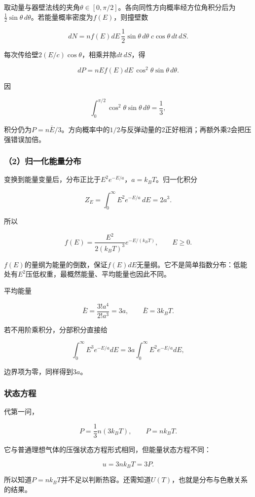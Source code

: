 \documentclass[12pt,a4paper,fontset=fandol]{ctexart}
\begin{document}
取动量与器壁法线的夹角\(\theta\in[0,\pi/2]\)。各向同性方向概率经方位角积分后为\(\frac12\sin\theta\,d\theta\)。若能量概率密度为\(f(E)\)，则撞壁数

\[
dN=n f(E)dE\,\frac12\sin\theta\,d\theta
\;c\cos\theta\,dt\,dS.
\]

每次传给壁\(2(E/c)\cos\theta\)，相乘并除\(dt\,dS\)，得

\[
dP=nE f(E)dE\,\cos^2\theta\sin\theta\,d\theta.
\]

因

\[
\int_0^{\pi/2}\cos^2\theta\sin\theta\,d\theta=\frac13,
\]

积分仍为\(P=n\bar E/3\)。方向概率中的\(1/2\)与反弹动量的2正好相消；再额外乘2会把压强错误加倍。

\subsubsection{（2）归一化能量分布}\label{ux5f52ux4e00ux5316ux80fdux91cfux5206ux5e03}

变换到能量变量后，分布正比于\(E^2e^{-E/a}\)，\(a=k_BT\)。归一化积分

\[
Z_E=\int_0^\infty E^2e^{-E/a}\,dE=2a^3.
\]

所以

\[
\boxed{f(E)=\frac{E^2}{2(k_BT)^3}e^{-E/(k_BT)}},
\qquad E\geq0.
\]

\(f(E)\)的量纲为能量的倒数，保证\(f(E)dE\)无量纲。它不是简单指数分布：低能处有\(E^2\)压低权重，最概然能量、平均能量也因此不同。

平均能量

\[
\bar E=
\frac{3!a^4}{2!a^3}
=3a,
\qquad \boxed{\bar E=3k_BT}.
\]

若不用阶乘积分，分部积分直接给

\[
\int_0^\infty E^3e^{-E/a}dE
=3a\int_0^\infty E^2e^{-E/a}dE,
\]

边界项为零，同样得到\(3a\)。

\subsubsection{状态方程}\label{ux72b6ux6001ux65b9ux7a0b}

代第一问，

\[
P=\frac13n(3k_BT),
\qquad \boxed{P=nk_BT}.
\]

它与普通理想气体的压强状态方程形式相同，但能量状态方程不同：

\[
\boxed{u=3nk_BT=3P}.
\]

所以知道\(P=nk_BT\)并不足以判断热容。还需知道\(U(T)\)，也就是分布与色散关系的结果。
\end{document}
